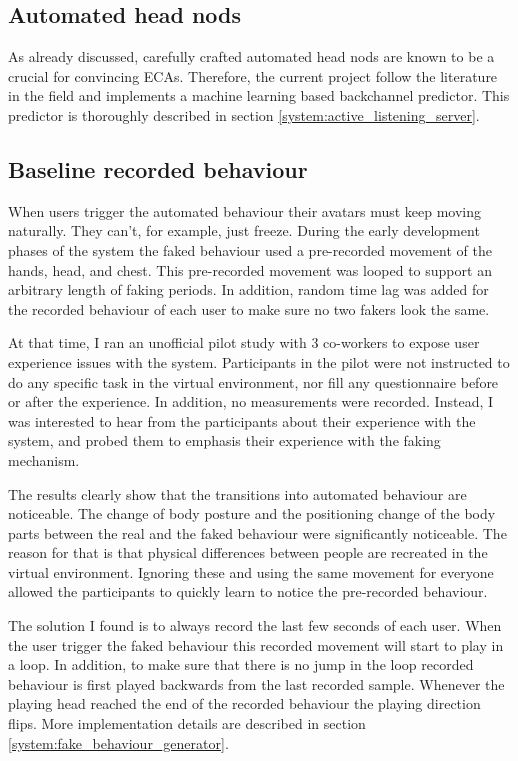 \documentclass[]{simple-thesis}
\begin{document}
\subsection{Automated head nods}

As already discussed, carefully crafted automated head nods are known to be a crucial for convincing ECAs.
Therefore, the current project follow the literature in the field and implements a machine learning based backchannel predictor.
This predictor is thoroughly described in section \ref{system:active_listening_server}.

\subsection{Baseline recorded behaviour}

When users trigger the automated behaviour their avatars must keep moving naturally.
They can't, for example, just freeze.
During the early development phases of the system the faked behaviour used a pre-recorded movement of the hands, head, and chest.
This pre-recorded movement was looped to support an arbitrary length of faking periods.
In addition, random time lag was added for the recorded behaviour of each user to make sure no two fakers look the same.

At that time, I ran an unofficial pilot study with 3 co-workers to expose user experience issues with the system.
Participants in the pilot were not instructed to do any specific task in the virtual environment, nor fill any questionnaire before or after the experience.
In addition, no measurements were recorded.
Instead, I was interested to hear from the participants about their experience with the system, and probed them to emphasis their experience with the faking mechanism.

The results clearly show that the transitions into automated behaviour are noticeable.
The change of body posture and the positioning change of the body parts between the real and the faked behaviour were significantly noticeable.
The reason for that is that physical differences between people are recreated in the virtual environment.
Ignoring these and using the same movement for everyone allowed the participants to quickly learn to notice the pre-recorded behaviour.

The solution I found is to always record the last few seconds of each user.
When the user trigger the faked behaviour this recorded movement will start to play in a loop.
In addition, to make sure that there is no jump in the loop recorded behaviour is first played backwards from the last recorded sample.
Whenever the playing head reached the end of the recorded behaviour the playing direction flips.
More implementation details are described in section \ref{system:fake_behaviour_generator}.
\end{document}
